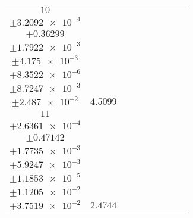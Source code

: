 \documentclass[8pt]{article}
\begin{document}
\begin{longtable}[l]{c c c c c c c c c}
$\num{10}$ & \begin{tabular}[c]{@{}c@{}}$\num{5.8357e-2}$ \\ $\pm\num{3.2092e-4}$\end{tabular} & \begin{tabular}[c]{@{}c@{}}$\num{9.5571e-2}$ \\ $\pm\num{0.36299}$\end{tabular} & \begin{tabular}[c]{@{}c@{}}$\num{4.3328}$ \\ $\pm\num{1.7922e-3}$\end{tabular} & \begin{tabular}[c]{@{}c@{}}$\num{3.5873e+3}$ \\ $\pm\num{4.175e-3}$\end{tabular} & \begin{tabular}[c]{@{}c@{}}$\num{7.1766}$ \\ $\pm\num{8.3522e-6}$\end{tabular} & \begin{tabular}[c]{@{}c@{}}$\num{1.5971}$ \\ $\pm\num{8.7247e-3}$\end{tabular} & \begin{tabular}[c]{@{}c@{}}$\num{4.5107}$ \\ $\pm\num{2.487e-2}$\end{tabular} & $\num{4.5099}$\\
$\num{11}$ & \begin{tabular}[c]{@{}c@{}}$\num{3.1547e-2}$ \\ $\pm\num{2.6361e-4}$\end{tabular} & \begin{tabular}[c]{@{}c@{}}$\num{-0.60547}$ \\ $\pm\num{0.47142}$\end{tabular} & \begin{tabular}[c]{@{}c@{}}$\num{-8.2049}$ \\ $\pm\num{1.7735e-3}$\end{tabular} & \begin{tabular}[c]{@{}c@{}}$\num{3.6185e+3}$ \\ $\pm\num{5.9247e-3}$\end{tabular} & \begin{tabular}[c]{@{}c@{}}$\num{7.239}$ \\ $\pm\num{1.1853e-5}$\end{tabular} & \begin{tabular}[c]{@{}c@{}}$\num{1.1884}$ \\ $\pm\num{1.1205e-2}$\end{tabular} & \begin{tabular}[c]{@{}c@{}}$\num{4.3241}$ \\ $\pm\num{3.7519e-2}$\end{tabular} & $\num{2.4744}$\\

\end{longtable}
\end{document}
